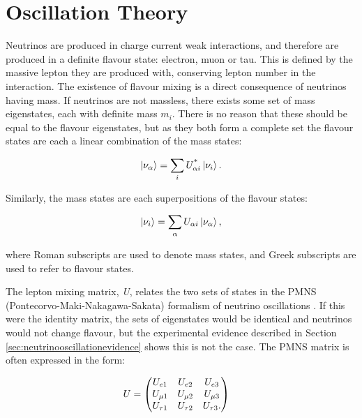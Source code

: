 \section{Oscillation Theory}\label{sec:oscillationtheory}

Neutrinos are produced in charge current weak interactions, and therefore are produced in a definite flavour state: electron, muon or tau. This is defined by the massive lepton they are produced with, conserving lepton number in the interaction. The existence of flavour mixing is a direct consequence of neutrinos having mass. If neutrinos are not massless, there exists some set of mass eigenstates, each with definite mass $m_i$. There is no reason that these should be equal to the flavour eigenstates, but as they both form a complete set the flavour states are each a linear combination of the mass states:

\begin{equation}
\ket{\nu_{\alpha}} = \sum_{i} U^{\text{*}}_{\alpha i} \ket{\nu_{i}}.
\end{equation}

Similarly, the mass states are each superpositions of the flavour states: 

\begin{equation}
\ket{\nu_{i}} = \sum_{\alpha} U_{\alpha i} \ket{\nu_{\alpha}},
\label{eqn:lincomb}
\end{equation}

where Roman subscripts are used to denote mass states, and Greek subscripts are used to refer to flavour states.

The lepton mixing matrix, \textit{U}, relates the two sets of states in the PMNS (Pontecorvo-Maki-Nakagawa-Sakata) formalism of neutrino oscillations \cite{pmns}. If this were the identity matrix, the sets of eigenstates would be identical and neutrinos would not change flavour, but the experimental evidence described in Section \ref{sec:neutrinooscillationevidence} shows this is not the case. The PMNS matrix is often expressed in the form:

\begin{equation}
\begin{aligned}
U & =
\begin{pmatrix}
U_{e1} & U_{e2} & U_{e 3}\\
U_{\mu 1} & U_{\mu 2} & U_{\mu 3} \\
U_{\tau 1} & U_{\tau 2} & U_{\tau 3}.
\end{pmatrix}
\end{aligned}
\vspace{8pt}
\end{equation}


